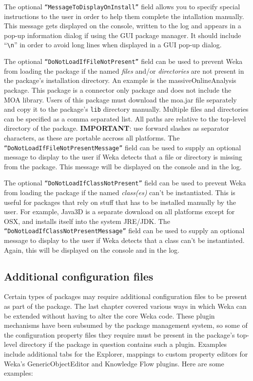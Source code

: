 The optional \texttt{``MessageToDisplayOnInstall''} field allows you
to specify special instructions to the user in order to help them
complete the intallation manually.  This message gets displayed on the
console, written to the log and appears in a pop-up information dialog
if using the GUI package manager. It should include ``\verb=\n='' in
order to avoid long lines when displayed in a GUI pop-up dialog.

The optional \texttt{``DoNotLoadIfFileNotPresent''} field can be used
to prevent Weka from loading the package if the named \textit{files}
and/or \textit{directories} are not present in the package's
installation directory. An example is the massiveOnlineAnalysis
package. This package is a connector only package and does not include
the MOA library. Users of this package must download the moa.jar file
separately and copy it to the package's \texttt{lib} directory
manually. Multiple files and directories can be specified as a comma
separated list. All paths are relative to the top-level directory of
the package. \textbf{IMPORTANT}: use forward slashes as separator
characters, as these are portable accross all platforms. The
\texttt{``DoNotLoadIfFileNotPresentMessage''} field can be used to
supply an optional message to display to the user if Weka detects that
a file or directory is missing from the package. This message will be
displayed on the console and in the log.

The optional \texttt{``DoNotLoadIfClassNotPresent''} field can be used
to prevent Weka from loading the package if the named
\textit{class(es)} can't be instantiated. This is useful for packages
that rely on stuff that has to be installed manually by the user. For
example, Java3D is a separate download on all platforms except for
OSX, and installs itself into the system JRE/JDK. The
\texttt{``DoNotLoadIfClassNotPresentMessage''} field can be used to
supply an optional message to display to the user if Weka detects that
a class can't be instantiated. Again, this will be displayed on the
console and in the log.

\subsection{Additional configuration files}

Certain types of packages may require additional configuration files
to be present as part of the package. The last chapter covered various
ways in which Weka can be extended without having to alter the core
Weka code. These plugin mechanisms have been subsumed by the package
management system, so some of the configuration property files they
require must be present in the package's top-level directory if the
package in question contains such a plugin. Examples include
additional tabs for the Explorer, mappings to custom property editors
for Weka's GenericObjectEditor and Knowledge Flow plugins. Here are
some examples:

